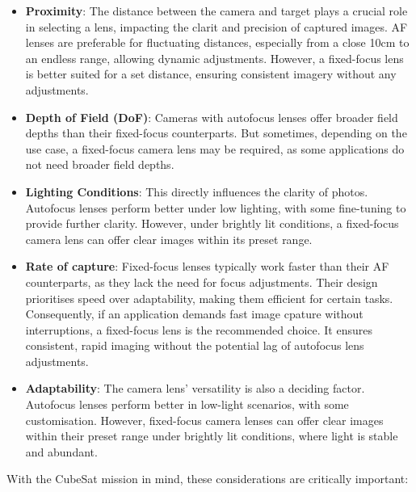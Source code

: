 \begin{itemize}
    \item \textbf{Proximity}: The distance between the camera and target plays a crucial role in selecting a lens, impacting the clarit and precision of captured images. AF lenses are preferable for fluctuating distances, especially from a close 10cm to an endless range, allowing dynamic adjustments. However, a fixed-focus lens is better suited for a set distance, ensuring consistent imagery without any adjustments.
    \item \textbf{Depth of Field (DoF)}: Cameras with autofocus lenses offer broader field depths than their fixed-focus counterparts. But sometimes, depending on the use case, a fixed-focus camera lens may be required, as some applications do not need broader field depths.
    \item \textbf{Lighting Conditions}: This directly influences the clarity of photos. Autofocus lenses perform better under low lighting, with some fine-tuning to provide further clarity. However, under brightly lit conditions, a fixed-focus camera lens can offer clear images within its preset range.
    \item \textbf{Rate of capture}: Fixed-focus lenses typically work faster than their AF counterparts, as they lack the need for focus adjustments. Their design prioritises speed over adaptability, making them efficient for certain tasks. Consequently, if an application demands fast image cpature without interruptions, a fixed-focus lens is the recommended choice. It ensures consistent, rapid imaging without the potential lag of autofocus lens adjustments.
    \item \textbf{Adaptability}: The camera lens' versatility is also a deciding factor. Autofocus lenses perform better in low-light scenarios, with some customisation. However, fixed-focus camera lenses can offer clear images within their preset range under brightly lit conditions, where light is stable and abundant.
\end{itemize}
With the CubeSat mission in mind, these considerations are critically important:
